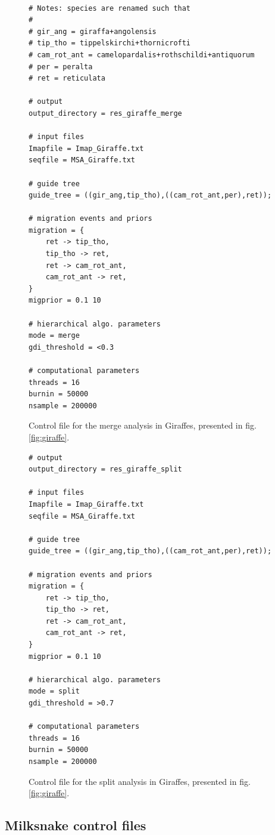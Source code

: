 \documentclass[A4]{article1}
\begin{document}
\begin{figure}[h]
	\footnotesize
	\begin{verbatim}

# Notes: species are renamed such that
#
# gir_ang = giraffa+angolensis
# tip_tho = tippelskirchi+thornicrofti
# cam_rot_ant = camelopardalis+rothschildi+antiquorum
# per = peralta
# ret = reticulata
		
# output
output_directory = res_giraffe_merge

# input files
Imapfile = Imap_Giraffe.txt
seqfile = MSA_Giraffe.txt

# guide tree
guide_tree = ((gir_ang,tip_tho),((cam_rot_ant,per),ret));

# migration events and priors
migration = {
    ret -> tip_tho,
    tip_tho -> ret,
    ret -> cam_rot_ant,
    cam_rot_ant -> ret,
}
migprior = 0.1 10

# hierarchical algo. parameters
mode = merge
gdi_threshold = <0.3

# computational parameters
threads = 16
burnin = 50000
nsample = 200000
	\end{verbatim}

	\caption{Control file for the merge analysis in Giraffes, presented in fig. \ref{fig:giraffe}. %
	} \label{fig:giraffe_mcf_merge}
\end{figure}

\begin{figure}[h]
	\footnotesize
	\begin{verbatim}
# output
output_directory = res_giraffe_split

# input files
Imapfile = Imap_Giraffe.txt
seqfile = MSA_Giraffe.txt

# guide tree
guide_tree = ((gir_ang,tip_tho),((cam_rot_ant,per),ret));

# migration events and priors
migration = {
    ret -> tip_tho,
    tip_tho -> ret,
    ret -> cam_rot_ant,
    cam_rot_ant -> ret,
}
migprior = 0.1 10

# hierarchical algo. parameters
mode = split
gdi_threshold = >0.7

# computational parameters
threads = 16
burnin = 50000
nsample = 200000
	\end{verbatim}
	
	\caption{Control file for the split analysis in Giraffes, presented in fig. \ref{fig:giraffe}. %
	} \label{fig:giraffe_mcf_split}
\end{figure}

\clearpage
\newpage
\subsection{Milksnake control files}
\end{document}
